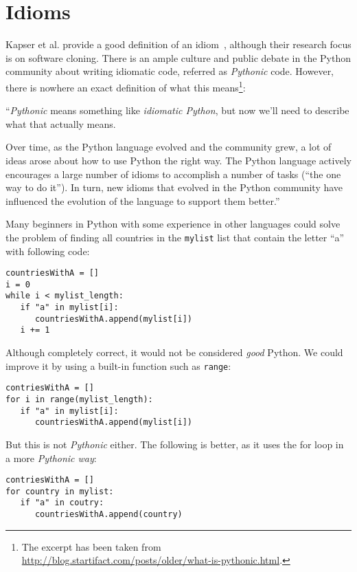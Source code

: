 \documentclass[conference]{IEEEtran}
\begin{document}
\section{Idioms}

Kapser et al. provide a good definition of an idiom~\cite{kapser2006cloning}, although their research focus is on software cloning.
There is an ample culture and public debate in the Python community about writing idiomatic 
code, referred as \emph{Pythonic} code. However, there is nowhere an exact definition of what this means\footnote{The excerpt has been taken from \url{http://blog.startifact.com/posts/older/what-is-pythonic.html}.}:

``\emph{Pythonic} means something like \emph{idiomatic Python}, but now we'll need to describe what that actually means.

Over time, as the Python language evolved and the community grew, a lot of ideas arose about how to use Python the right way. The Python language actively encourages a large number of idioms to accomplish a number of tasks (``the one way to do it''). In turn, new idioms that evolved in the Python community have influenced the evolution of the language to support them better.''


Many beginners in Python with some experience in other languages could
solve the problem of finding all countries in the \texttt{mylist} list that
contain the letter ``a'' with following code:

\begin{verbatim}
countriesWithA = []
i = 0
while i < mylist_length:
   if "a" in mylist[i]:
      countriesWithA.append(mylist[i])
   i += 1
\end{verbatim}

Although completely correct, it would not
be considered \emph{good} Python. We could improve it by using a built-in
function such as \texttt{range}:

\begin{verbatim}
contriesWithA = []
for i in range(mylist_length):
   if "a" in mylist[i]:
      countriesWithA.append(mylist[i])
\end{verbatim}

But this is not \emph{Pythonic} either. The following is better, as it uses the for
loop in a more \emph{Pythonic way}:

\begin{verbatim}
contriesWithA = []
for country in mylist:
   if "a" in coutry:
      countriesWithA.append(country)
\end{verbatim}
\end{document}
